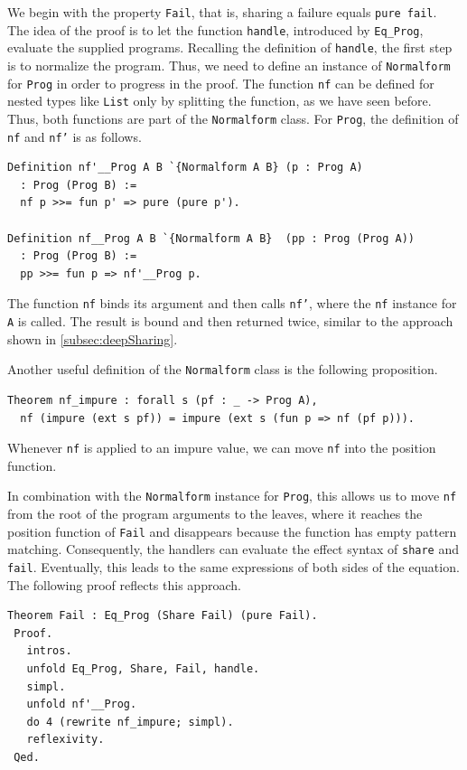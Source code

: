 \documentclass[a4paper, 11pt, fleqn, twoside, abstract=on]{scrreprt}
\newcommand{\cinl}[1]{\texttt{#1}}
\begin{document}
We begin with the property \cinl{Fail}, that is, sharing a failure equals \cinl{pure fail}.
The idea of the proof is to let the function \cinl{handle}, introduced by \cinl{Eq_Prog}, evaluate the supplied programs.
Recalling the definition of \cinl{handle}, the first step is to normalize the program.
Thus, we need to define an instance of \cinl{Normalform} for \cinl{Prog} in order to progress in the proof.
The function \cinl{nf} can be defined for nested types like \cinl{List} only by splitting the function, as we have seen before.
Thus, both functions are part of the \cinl{Normalform} class.
For \cinl{Prog}, the definition of \cinl{nf} and \cinl{nf'} is as follows.

\begin{verbatim}
Definition nf'__Prog A B `{Normalform A B} (p : Prog A) 
  : Prog (Prog B) :=
  nf p >>= fun p' => pure (pure p').

Definition nf__Prog A B `{Normalform A B}  (pp : Prog (Prog A)) 
  : Prog (Prog B) :=
  pp >>= fun p => nf'__Prog p.
\end{verbatim}

The function \cinl{nf} binds its argument and then calls \cinl{nf'}, where the \cinl{nf} instance for \cinl{A} is called.
The result is bound and then returned twice, similar to the approach shown in \autoref{subsec:deepSharing}.

Another useful definition of the \cinl{Normalform} class is the following proposition.

\begin{verbatim}
Theorem nf_impure : forall s (pf : _ -> Prog A),
  nf (impure (ext s pf)) = impure (ext s (fun p => nf (pf p))).
\end{verbatim}
\noindent
Whenever \cinl{nf} is applied to an impure value, we can move \cinl{nf} into the position function.

In combination with the \cinl{Normalform} instance for \cinl{Prog}, this allows us to move \cinl{nf} from the root of the program arguments to the leaves, where it reaches the position function of \cinl{Fail} and disappears because the function has empty pattern matching.
Consequently, the handlers can evaluate the effect syntax of \cinl{share} and \cinl{fail}.
Eventually, this leads to the same expressions of both sides of the equation.
The following proof reflects this approach.

\begin{verbatim}
Theorem Fail : Eq_Prog (Share Fail) (pure Fail).
 Proof.
   intros.
   unfold Eq_Prog, Share, Fail, handle.
   simpl.
   unfold nf'__Prog.
   do 4 (rewrite nf_impure; simpl).
   reflexivity.
 Qed.
\end{verbatim}
\end{document}
